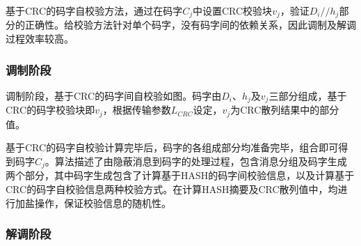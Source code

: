 基于CRC的码字自校验方法，通过在码字$C_{j}$中设置CRC校验块$v_{j}$，验证$D_{i}//h_{j}$部分的正确性。给校验方法针对单个码字，没有码字间的依赖关系，因此调制及解调过程效率较高。

\subsubsection{调制阶段}
\label{chap:hash:robustness:crc:modulation}


调制阶段，基于CRC的码字间自校验如图。码字由$D_{i}$、$h_{j}$及$v_{j}$三部分组成，基于CRC的码字校验块即$v_{j}$，根据传输参数$L_{CRC}$设定，$v_{j}$为CRC散列结果中的部分值。

基于CRC的码字自校验计算完毕后，码字的各组成部分均准备完毕，组合即可得到码字$C_{j}$。算法描述了由隐蔽消息到码字的处理过程，包含消息分组及码字生成两个部分，其中码字生成包含了计算基于HASH的码字间校验信息，以及计算基于CRC的码字自校验信息两种校验方式。在计算HASH摘要及CRC散列值中，均进行加盐操作，保证校验信息的随机性。

\subsubsection{解调阶段}
\label{chap:hash:robustness:crc:demodulation}

